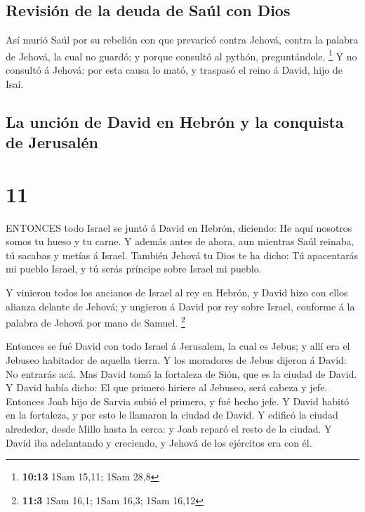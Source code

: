 \hypertarget{revisiuxf3n-de-la-deuda-de-sauxfal-con-dios}{%
\subsection{Revisión de la deuda de Saúl con
Dios}\label{revisiuxf3n-de-la-deuda-de-sauxfal-con-dios}}

 Así murió Saúl por su rebelión con que prevaricó contra
Jehová, contra la palabra de Jehová, la cual no guardó; y porque
consultó al pythón, preguntándole, \footnote{\textbf{10:13} 1Sam 15,11;
  1Sam 28,8}  Y no consultó á Jehová: por esta causa lo
mató, y traspasó el reino á David, hijo de Isaí.

\hypertarget{la-unciuxf3n-de-david-en-hebruxf3n-y-la-conquista-de-jerusaluxe9n}{%
\subsection{La unción de David en Hebrón y la conquista de
Jerusalén}\label{la-unciuxf3n-de-david-en-hebruxf3n-y-la-conquista-de-jerusaluxe9n}}

\hypertarget{section-10}{%
\section{11}\label{section-10}}

 ENTONCES todo Israel se juntó á David en Hebrón, diciendo:
He aquí nosotros somos tu hueso y tu carne.  Y además antes
de ahora, aun mientras Saúl reinaba, tú sacabas y metías á Israel.
También Jehová tu Dios te ha dicho: Tú apacentarás mi pueblo Israel, y
tú serás príncipe sobre Israel mi pueblo.

 Y vinieron todos los ancianos de Israel al rey en Hebrón, y
David hizo con ellos alianza delante de Jehová; y ungieron á David por
rey sobre Israel, conforme á la palabra de Jehová por mano de Samuel.
\footnote{\textbf{11:3} 1Sam 16,1; 1Sam 16,3; 1Sam 16,12}

 Entonces se fué David con todo Israel á Jerusalem, la cual
es Jebus; y allí era el Jebuseo habitador de aquella tierra.
 Y los moradores de Jebus dijeron á David: No entrarás acá.
Mas David tomó la fortaleza de Sión, que es la ciudad de David.
 Y David había dicho: El que primero hiriere al Jebuseo,
será cabeza y jefe. Entonces Joab hijo de Sarvia subió el primero, y fué
hecho jefe.  Y David habitó en la fortaleza, y por esto le
llamaron la ciudad de David.  Y edificó la ciudad alrededor,
desde Millo hasta la cerca: y Joab reparó el resto de la ciudad.
 Y David iba adelantando y creciendo, y Jehová de los
ejércitos era con él.

